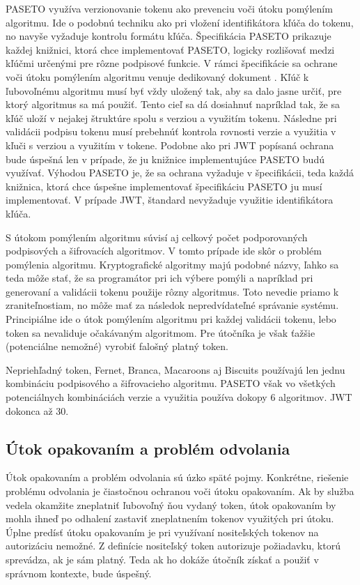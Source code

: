 PASETO využíva verzionovanie tokenu ako prevenciu voči útoku pomýlením algoritmu. Ide o podobnú techniku ako pri vložení identifikátora kľúča do tokenu, no navyše vyžaduje kontrolu formátu kľúča. Špecifikácia PASETO \cite{paseto_git} prikazuje každej knižnici, ktorá chce implementovať PASETO, logicky rozlišovať medzi kľúčmi určenými pre rôzne podpisové funkcie. V rámci špecifikácie sa ochrane voči útoku pomýlením algoritmu venuje dedikovaný dokument \cite{alg_lucidity}. Kľúč k ľubovoľnému algoritmu musí byť vždy uložený tak, aby sa dalo jasne určiť, pre ktorý algoritmus sa má použiť. Tento cieľ sa dá dosiahnuť napríklad tak, že sa kľúč uloží v nejakej štruktúre spolu s verziou a využitím tokenu. Následne pri validácii podpisu tokenu musí prebehnúť kontrola rovnosti verzie a využitia v kľuči s verziou a využitím v tokene. Podobne ako pri JWT popísaná ochrana bude úspešná len v prípade, že ju knižnice implementujúce PASETO budú využívať. Výhodou PASETO je, že sa ochrana vyžaduje v špecifikácii, teda každá knižnica, ktorá chce úspešne implementovať špecifikáciu PASETO ju musí implementovať. V prípade JWT, štandard \cite{jwt_rfc} nevyžaduje využitie identifikátora kľúča.

S útokom pomýlením algoritmu súvisí aj celkový počet podporovaných podpisových a šifrovacích algoritmov. V tomto prípade ide skôr o problém pomýlenia algoritmu. Kryptografické algoritmy majú podobné názvy, ľahko sa teda môže stať, že sa programátor pri ich výbere pomýli a napríklad pri generovaní a validácii tokenu použije rôzny algoritmus. Toto nevedie priamo k zraniteľnostiam, no môže mať za následok nepredvídateľné správanie systému. Principiálne ide o útok pomýlením algoritmu pri každej validácii tokenu, lebo token sa nevaliduje očakávaným algoritmom. Pre útočníka je však ťažšie (potenciálne nemožné) vyrobiť falošný platný token.

Nepriehľadný token, Fernet, Branca, Macaroons aj Biscuits používajú len jednu kombináciu podpisového a šifrovacieho algoritmu. PASETO však vo všetkých potenciálnych kombináciách verzie a využitia používa dokopy 6 algoritmov. JWT dokonca až 30.

\subsection{Útok opakovaním a problém odvolania}

\label{sec:replay} %

Útok opakovaním a problém odvolania sú úzko späté pojmy. Konkrétne, riešenie problému odvolania je čiastočnou ochranou voči útoku opakovaním. Ak by služba vedela okamžite zneplatniť ľubovoľný ňou vydaný token, útok opakovaním by mohla ihneď po odhalení zastaviť zneplatnením tokenov využitých pri útoku. Úplne predísť útoku opakovaním je pri využívaní nositeľských tokenov na autorizáciu nemožné. Z definície nositeľský token autorizuje požiadavku, ktorú sprevádza, ak je sám platný. Teda ak ho dokáže útočník získať a použiť v správnom kontexte, bude úspešný.

